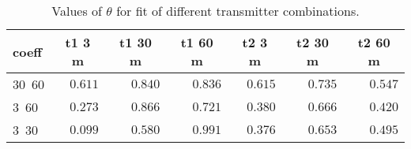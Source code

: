 %
\begin{table}[!tbp]
\caption{Values of $\theta$ for fit of different transmitter combinations.\label{tab:coeff}} 
\begin{center}
\begin{tabular}{lrrrrrr}
\hline\hline
\multicolumn{1}{l}{coeff}&\multicolumn{1}{c}{t1 3 m}&\multicolumn{1}{c}{t1 30 m}&\multicolumn{1}{c}{t1 60 m}&\multicolumn{1}{c}{t2 3 m}&\multicolumn{1}{c}{t2 30 m}&\multicolumn{1}{c}{t2 60 m}\tabularnewline
\hline
30~60&$0.611$&$0.840$&$0.836$&$0.615$&$0.735$&$0.547$\tabularnewline
3~60&$0.273$&$0.866$&$0.721$&$0.380$&$0.666$&$0.420$\tabularnewline
3~30&$0.099$&$0.580$&$0.991$&$0.376$&$0.653$&$0.495$\tabularnewline
\hline
\end{tabular}
\end{center}
\end{table}


